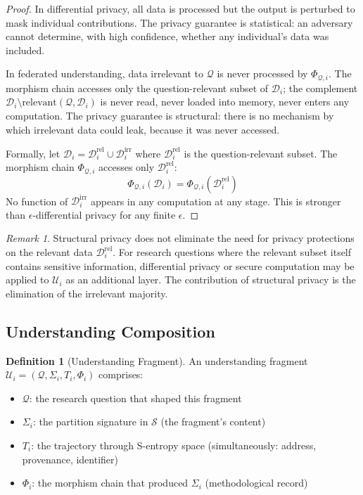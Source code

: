 \documentclass[10pt,twocolumn]{article}
\theoremstyle{definition}
\newtheorem{definition}[theorem]{Definition}
\theoremstyle{remark}
\newtheorem{remark}[theorem]{Remark}
\newcommand{\Sspace}{\mathcal{S}}
\newcommand{\morphism}{\Phi}
\newcommand{\question}{\mathcal{Q}}
\newcommand{\dataset}{\mathcal{D}}
\newcommand{\understanding}{\mathcal{U}}
\begin{document}
\begin{proof}
In differential privacy, all data is processed but the output is perturbed to mask individual contributions. The privacy guarantee is statistical: an adversary cannot determine, with high confidence, whether any individual's data was included.

In federated understanding, data irrelevant to $\question$ is never processed by $\morphism_{\question,i}$. The morphism chain accesses only the question-relevant subset of $\dataset_i$; the complement $\dataset_i \setminus \text{relevant}(\question, \dataset_i)$ is never read, never loaded into memory, never enters any computation. The privacy guarantee is structural: there is no mechanism by which irrelevant data could leak, because it was never accessed.

Formally, let $\dataset_i = \dataset_i^{\text{rel}} \cup \dataset_i^{\text{irr}}$ where $\dataset_i^{\text{rel}}$ is the question-relevant subset. The morphism chain $\morphism_{\question,i}$ accesses only $\dataset_i^{\text{rel}}$:
\begin{equation}
\morphism_{\question,i}(\dataset_i) = \morphism_{\question,i}(\dataset_i^{\text{rel}})
\end{equation}
No function of $\dataset_i^{\text{irr}}$ appears in any computation at any stage. This is stronger than $\epsilon$-differential privacy for any finite $\epsilon$.
\end{proof}

\begin{remark}
Structural privacy does not eliminate the need for privacy protections on the relevant data $\dataset_i^{\text{rel}}$. For research questions where the relevant subset itself contains sensitive information, differential privacy or secure computation \cite{gentry2009} may be applied to $\understanding_i$ as an additional layer. The contribution of structural privacy is the elimination of the irrelevant majority.
\end{remark}

\subsection{Understanding Composition}

\begin{definition}[Understanding Fragment]
An understanding fragment $\understanding_i = (\question, \Sigma_i, T_i, \morphism_i)$ comprises:
\begin{itemize}[nosep]
\item $\question$: the research question that shaped this fragment
\item $\Sigma_i$: the partition signature in $\Sspace$ (the fragment's content)
\item $T_i$: the trajectory through S-entropy space (simultaneously: address, provenance, identifier)
\item $\morphism_i$: the morphism chain that produced $\Sigma_i$ (methodological record)
\end{itemize}
\end{definition}
\end{document}
